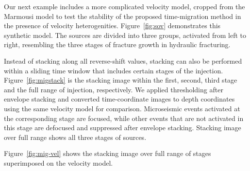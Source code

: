 Our next example includes a more complicated velocity model, cropped from the Marmousi model \cite[]{versteeg1994marm} to test the stability of the proposed time-migration method in the presence of velocity heterogenities.
Figure~\ref{fig:sov} demonstrates this synthetic model.
The sources are divided into three groups, activated from left to right, resembling the three stages of fracture growth in hydraulic fracturing.


Instead of stacking along all reverse-shift values, stacking can also be performed within a sliding time window that includes certain stages of the injection.
Figure~\ref{fig:migstack} is the stacking image within the first, second, third stage and the full range of injection, respectively.
We applied thresholding after envelope stacking and converted time-coordinate images to depth coordinates using the same velocity model for comparison.
Microseismic events activated at the corresponding stage are focused, while other events that are not activated in this stage are defocused and suppressed after envelope stacking.
Stacking image over full range shows all three stages of sources.


Figure~\ref{fig:mig-vel} shows the stacking image over full range of stages superimposed on the velocity model.

